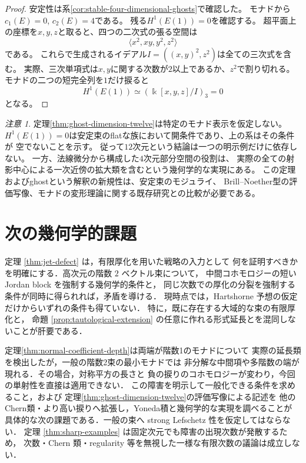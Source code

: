 \documentclass[a4paper,11pt]{ltjsarticle}
\numberwithin{equation}{section}
\theoremstyle{plain}
\theoremstyle{definition}
\theoremstyle{remark}
\newtheorem{remark}[theorem]{注意}
\begin{document}
\begin{proof}
安定性は系\ref{cor:stable-four-dimensional-ghosts}で確認した。
モナドから$c_1(E)=0$, $c_2(E)=4$である。
残る$H^1(E(1))=0$を確認する。
超平面上の座標を$x,y,z$と取ると、四つの二次式の張る空間は
\[
 \langle x^2,xy,y^2,z^2\rangle
\]
である。
これらで生成されるイデアル$I=((x,y)^2,z^2)$は全ての三次式を含む。
実際、三次単項式は$x,y$に関する次数が$2$以上であるか、$z^2$で割り切れる。
モナドの二つの短完全列を$1$だけ捩ると
\[
 H^1(E(1))\simeq(\Bbbk[x,y,z]/I)_3=0
\]
となる。
\end{proof}

\begin{remark}
定理\ref{thm:ghost-dimension-twelve}は特定のモナド表示を仮定しない。
$H^1(E(1))=0$は安定束のflatな族において開条件であり、上の系はその条件が
空でないことを示す。
従って$12$次元という結論は一つの明示例だけに依存しない。
一方、法線微分から構成した$4$次元部分空間の役割は、
実際の全ての射影中心による一次近傍の拡大類を含むという幾何学的な実現にある。
この定理およびghostという解釈の新規性は、安定束のモジュライ、
Brill--Noether型の評価写像、モナドの変形理論に関する既存研究との比較が必要である。
\end{remark}


\section{次の幾何学的課題}

定理 \ref{thm:jet-defect} は，有限厚化を用いた戦略の入力として
何を証明すべきかを明確にする．高次元の階数 $2$ ベクトル束について，
中間コホモロジーの短い Jordan block を強制する幾何学的条件と，
同じ次数での厚化の分裂を強制する条件が同時に得られれば，矛盾を導ける．
現時点では，Hartshorne 予想の仮定だけからいずれの条件も得ていない．
特に，既に存在する大域的な束の有限厚化と，
命題 \ref{prop:tautological-extension} の任意に作れる形式延長とを混同しないことが肝要である．

定理\ref{thm:normal-coefficient-depth}は両端が階数1のモナドについて
実際の延長類を検出したが，一般の階数2束の最小モナドでは
非分解な中間項や多階数の端が現れる．その場合，対称平方の長さと
負の捩りのコホモロジーが変わり，今回の単射性を直接は適用できない．
この障害を明示して一般化できる条件を求めること，および
定理\ref{thm:ghost-dimension-twelve}の評価写像による記述を
他のChern類・より高い捩りへ拡張し，Yoneda積と幾何学的な実現を調べることが
具体的な次の課題である．一般の束へ strong Lefschetz 性を仮定してはならない．
定理 \ref{thm:sharp-examples} は固定次元でも障害の出現次数が発散するため，
次数・Chern 類・regularity 等を無視した一様な有限次数の議論は成立しない．



\end{document}
